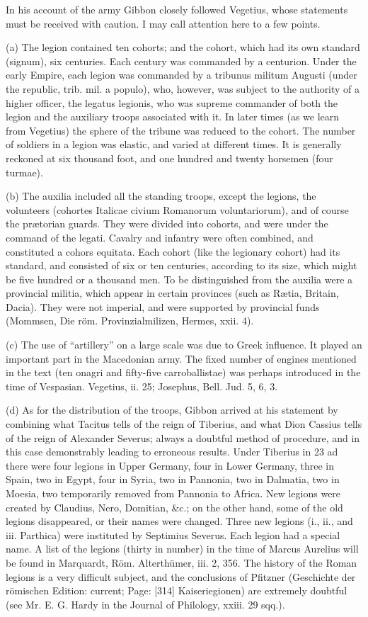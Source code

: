 In his account of the army Gibbon closely followed Vegetius, whose statements must be received with caution. I may call attention here to a few points.

(a) The legion contained ten cohorts; and the cohort, which had its own standard (signum), six centuries. Each century was commanded by a centurion. Under the early Empire, each legion was commanded by a tribunus militum Augusti (under the republic, trib. mil. a populo), who, however, was subject to the authority of a higher officer, the legatus legionis, who was supreme commander of both the legion and the auxiliary troops associated with it. In later times (as we learn from Vegetius) the sphere of the tribune was reduced to the cohort. The number of soldiers in a legion was elastic, and varied at different times. It is generally reckoned at six thousand foot, and one hundred and twenty horsemen (four turmae).

(b) The auxilia included all the standing troops, except the legions, the volunteers (cohortes Italicae civium Romanorum voluntariorum), and of course the prætorian guards. They were divided into cohorts, and were under the command of the legati. Cavalry and infantry were often combined, and constituted a cohors equitata. Each cohort (like the legionary cohort) had its standard, and consisted of six or ten centuries, according to its size, which might be five hundred or a thousand men. To be distinguished from the auxilia were a provincial militia, which appear in certain provinces (such as Rætia, Britain, Dacia). They were not imperial, and were supported by provincial funds (Mommsen, Die röm. Provinzialmilizen, Hermes, xxii. 4).

(c) The use of \texthebrew{“}artillery\texthebrew{}” on a large scale was due to Greek influence. It played an important part in the Macedonian army. The fixed number of engines mentioned in the text (ten onagri and fifty-five carroballistae) was perhaps introduced in the time of Vespasian. Vegetius, ii. 25; Josephus, Bell. Jud. 5, 6, 3.

(d) As for the distribution of the troops, Gibbon arrived at his statement by combining what Tacitus tells of the reign of Tiberius, and what Dion Cassius tells of the reign of Alexander Severus; always a doubtful method of procedure, and in this case demonstrably leading to erroneous results. Under Tiberius in 23 ad there were four legions in Upper Germany, four in Lower Germany, three in Spain, two in Egypt, four in Syria, two in Pannonia, two in Dalmatia, two in Moesia, two temporarily removed from Pannonia to Africa. New legions were created by Claudius, Nero, Domitian, \&c.; on the other hand, some of the old legions disappeared, or their names were changed. Three new legions (i., ii., and iii. Parthica) were instituted by Septimius Severus. Each legion had a special name. A list of the legions (thirty in number) in the time of Marcus Aurelius will be found in Marquardt, Röm. Alterthümer, iii. 2, 356. The history of the Roman legions is a very difficult subject, and the conclusions of Pfitzner (Geschichte der römischen Edition: current; Page: [314] Kaiseriegionen) are extremely doubtful (see Mr. E. G. Hardy in the Journal of Philology, xxiii. 29 sqq.).

